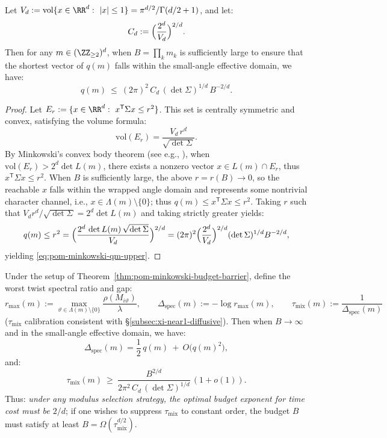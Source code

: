 \begin{theorem}\label{thm:pom-minkowski-budget-barrier}
Let $V_d:=\mathrm{vol}\{x\in\RR^d:\ |x|\le 1\}=\pi^{d/2}/\Gamma(d/2+1)$, and let:
\[
C_d:=\Bigl(\frac{2^{d}}{V_d}\Bigr)^{2/d}.
\]
Then for any $m\in(\ZZ_{\ge 2})^d$, when $B=\prod_k m_k$ is sufficiently large to ensure that the shortest vector of $q(m)$ falls within the small-angle effective domain, we have:
\begin{equation}\label{eq:pom-minkowski-qm-upper}
q(m)\ \le\ (2\pi)^2\,C_d\,(\det\Sigma)^{1/d}\,B^{-2/d}.
\end{equation}
\end{theorem}

\begin{proof}
Let $E_r:=\{x\in\RR^d:\ x^{\mathsf T}\Sigma x\le r^2\}$.
This set is centrally symmetric and convex, satisfying the volume formula:
\[
\mathrm{vol}(E_r)=\frac{V_d\,r^d}{\sqrt{\det\Sigma}}.
\]
By Minkowski's convex body theorem (see e.g., \cite{Cassels1957}), when $\mathrm{vol}(E_r)>2^d\det L(m)$, there exists a nonzero vector $x\in L(m)\cap E_r$, thus $x^{\mathsf T}\Sigma x\le r^2$.
When $B$ is sufficiently large, the above $r=r(B)\to 0$, so the reachable $x$ falls within the wrapped angle domain and represents some nontrivial character channel, i.e., $x\in\Lambda(m)\setminus\{0\}$;
thus $q(m)\le x^{\mathsf T}\Sigma x\le r^2$.
Taking $r$ such that
\(
V_d r^d/\sqrt{\det\Sigma}=2^d\det L(m)
\)
and taking strictly greater yields:
\[
q(m)
\le r^2
=\Bigl(\frac{2^d\,\det L(m)\,\sqrt{\det\Sigma}}{V_d}\Bigr)^{2/d}
=(2\pi)^2\Bigl(\frac{2^d}{V_d}\Bigr)^{2/d}(\det\Sigma)^{1/d}B^{-2/d},
\]
yielding \eqref{eq:pom-minkowski-qm-upper}.
\end{proof}

\begin{corollary}\label{cor:pom-multi-axis-mixing-budget-barrier}
Under the setup of Theorem~\ref{thm:pom-minkowski-budget-barrier}, define the worst twist spectral ratio and gap:
\[
r_{\max}(m):=\max_{\vartheta\in \Lambda(m)\setminus\{0\}}\frac{\rho(M_{i\vartheta})}{\lambda},
\qquad
\Delta_{\mathrm{spec}}(m):=-\log r_{\max}(m),
\qquad
\tau_{\mathrm{mix}}(m):=\frac{1}{\Delta_{\mathrm{spec}}(m)}
\]
($\tau_{\mathrm{mix}}$ calibration consistent with \S\ref{subsec:xi-near1-diffusive}).
Then when $B\to\infty$ and in the small-angle effective domain, we have:
\begin{equation}\label{eq:pom-multi-axis-gap-qm}
\Delta_{\mathrm{spec}}(m)=\frac12\,q(m)\ +\ O\!\bigl(q(m)^2\bigr),
\end{equation}
and:
\begin{equation}\label{eq:pom-multi-axis-taumix-lb}
\tau_{\mathrm{mix}}(m)\ \ge\ \frac{B^{2/d}}{2\pi^2\,C_d\,(\det\Sigma)^{1/d}}\,(1+o(1)).
\end{equation}
Thus: \emph{under any modulus selection strategy, the optimal budget exponent for time cost must be $2/d$}; if one wishes to suppress $\tau_{\mathrm{mix}}$ to constant order, the budget $B$ must satisfy at least $B=\Omega(\tau_{\mathrm{mix}}^{d/2})$.
\end{corollary}

